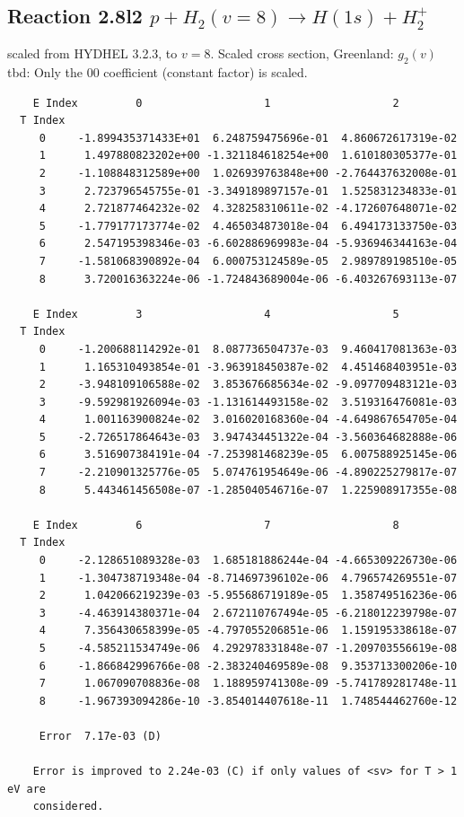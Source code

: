 \documentclass[12pt,dvipdfmx]{article}
\begin{document}
\subsection{
Reaction 2.8l2 $   p + H_2(v=8) \rightarrow H(1s) + H_2^+$}
scaled from HYDHEL 3.2.3, to $v=8$. Scaled cross section, Greenland: $g_2(v)$
tbd:
Only the 00 coefficient (constant factor) is scaled.


\begin{small}\begin{verbatim}
    E Index         0                   1                   2
  T Index
     0     -1.899435371433E+01  6.248759475696e-01  4.860672617319e-02
     1      1.497880823202e+00 -1.321184618254e+00  1.610180305377e-01
     2     -1.108848312589e+00  1.026939763848e+00 -2.764437632008e-01
     3      2.723796545755e-01 -3.349189897157e-01  1.525831234833e-01
     4      2.721877464232e-02  4.328258310611e-02 -4.172607648071e-02
     5     -1.779177173774e-02  4.465034873018e-04  6.494173133750e-03
     6      2.547195398346e-03 -6.602886969983e-04 -5.936946344163e-04
     7     -1.581068390892e-04  6.000753124589e-05  2.989789198510e-05
     8      3.720016363224e-06 -1.724843689004e-06 -6.403267693113e-07

    E Index         3                   4                   5
  T Index
     0     -1.200688114292e-01  8.087736504737e-03  9.460417081363e-03
     1      1.165310493854e-01 -3.963918450387e-02  4.451468403951e-03
     2     -3.948109106588e-02  3.853676685634e-02 -9.097709483121e-03
     3     -9.592981926094e-03 -1.131614493158e-02  3.519316476081e-03
     4      1.001163900824e-02  3.016020168360e-04 -4.649867654705e-04
     5     -2.726517864643e-03  3.947434451322e-04 -3.560364682888e-06
     6      3.516907384191e-04 -7.253981468239e-05  6.007588925145e-06
     7     -2.210901325776e-05  5.074761954649e-06 -4.890225279817e-07
     8      5.443461456508e-07 -1.285040546716e-07  1.225908917355e-08

    E Index         6                   7                   8
  T Index
     0     -2.128651089328e-03  1.685181886244e-04 -4.665309226730e-06
     1     -1.304738719348e-04 -8.714697396102e-06  4.796574269551e-07
     2      1.042066219239e-03 -5.955686719189e-05  1.358749516236e-06
     3     -4.463914380371e-04  2.672110767494e-05 -6.218012239798e-07
     4      7.356430658399e-05 -4.797055206851e-06  1.159195338618e-07
     5     -4.585211534749e-06  4.292978331848e-07 -1.209703556619e-08
     6     -1.866842996766e-08 -2.383240469589e-08  9.353713300206e-10
     7      1.067090708836e-08  1.188959741308e-09 -5.741789281748e-11
     8     -1.967393094286e-10 -3.854014407618e-11  1.748544462760e-12

     Error  7.17e-03 (D)

    Error is improved to 2.24e-03 (C) if only values of <sv> for T > 1 eV are
    considered.
\end{verbatim}\end{small}
\newpage
\end{document}
